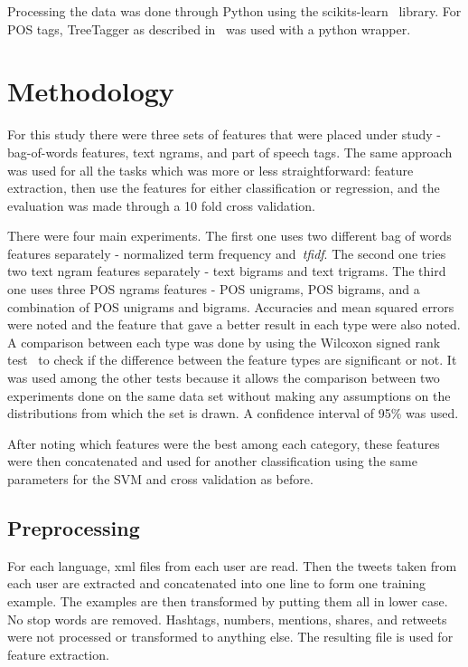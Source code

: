 \documentclass[a4paper]{llncs}
\begin{document}
Processing the data was done through Python using the scikits-learn~\cite{scikit-learn} library. For POS tags, TreeTagger as described in~\cite{schmid1994probabilistic} was used with a python wrapper. 

\section{Methodology}
For this study there were three sets of features that were placed under study - bag-of-words features, text ngrams, and  part of speech tags. The same approach was used for all the tasks which was more or less straightforward: feature extraction, then use the features for either classification or regression, and the evaluation was made through a 10 fold cross validation.

There were four main experiments. The first one uses two different bag of words features separately - normalized term frequency and~\textit{tfidf}. The second one tries two text ngram features separately - text bigrams and text trigrams. The third one uses three POS ngrams features - POS unigrams, POS bigrams, and a combination of POS unigrams and bigrams. Accuracies and mean squared errors were noted and the feature that gave a better result in each type were also noted. A comparison between each type was done by using the Wilcoxon signed rank test~\cite{wilcoxon1945individual} to check if the difference between the feature types are significant or not. It was used among the other tests because it allows the comparison between two experiments done on the same data set without making any assumptions on the distributions from which the set is drawn. A confidence interval of 95\% was used.

After noting which features were the best among each category, these features were then concatenated and used for another classification using the same parameters for the SVM and cross validation as before.
\subsection{Preprocessing}
For each language, xml files from each user are read. Then the tweets taken from each user are extracted and concatenated into one line to form one training example. The examples are then transformed by putting them all in lower case. No stop words are removed. Hashtags, numbers, mentions, shares, and retweets were not processed or transformed to anything else. The resulting file is used for feature extraction.  
\end{document}
